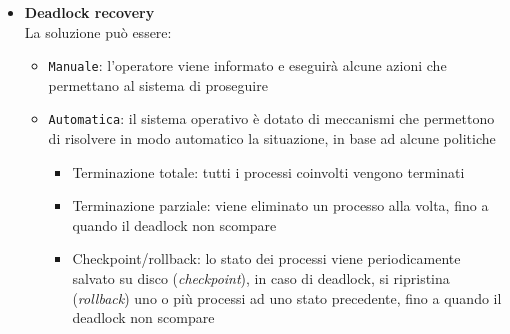 \documentclass[a4paper,12pt]{article}
\begin{document}
\begin{itemize}
\begin{itemize}
  \item \textbf{Deadlock recovery} \\
  La soluzione può essere:
  \begin{itemize}
    \item \texttt{Manuale}: l'operatore viene informato e eseguirà alcune azioni che permettano al sistema di proseguire
    \item \texttt{Automatica}: il sistema operativo è dotato di meccanismi che permettono di risolvere in modo automatico la situazione, in base ad alcune politiche
    \begin{itemize}
      \item Terminazione totale: tutti i processi coinvolti vengono terminati
      \item Terminazione parziale: viene eliminato un processo alla volta, fino a quando il deadlock non scompare
      \item Checkpoint/rollback: lo stato dei processi viene periodicamente salvato su disco (\textit{checkpoint}), in caso di deadlock, si ripristina (\textit{rollback}) uno o più processi ad uno stato precedente, fino a quando il deadlock non scompare
    \end{itemize}
  

\end{itemize}
\end{itemize}
\end{itemize}
\end{document}
